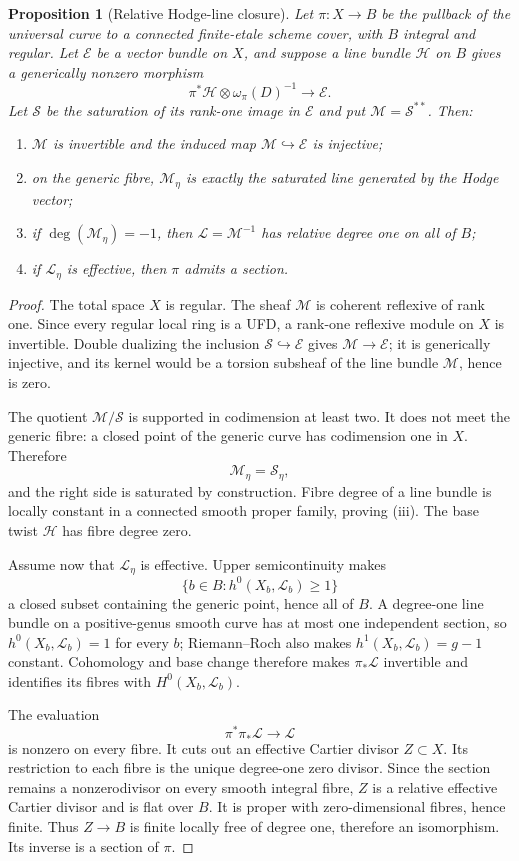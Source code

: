 \documentclass[11pt]{article}
\newtheorem{proposition}[theorem]{Proposition}
\theoremstyle{definition}
\newcommand{\Mcal}{\mathcal M}
\newcommand{\Ecal}{\mathcal E}
\newcommand{\Lcal}{\mathcal L}
\newcommand{\Hcal}{\mathcal H}
\newcommand{\Scal}{\mathcal S}
\begin{document}
\begin{proposition}[Relative Hodge-line closure]
\label{prop:relative-hodge-line}
Let $\pi:X\to B$ be the pullback of the universal curve to a connected
finite-etale scheme cover, with $B$ integral and regular.  Let $\Ecal$ be a
vector bundle on $X$, and suppose a line bundle $\Hcal$ on $B$ gives a
generically nonzero morphism
\[
 \pi^*\Hcal\otimes\omega_\pi(D)^{-1}\longrightarrow\Ecal.
\]
Let $\Scal$ be the saturation of its rank-one image in $\Ecal$ and put
$\Mcal=\Scal^{**}$.  Then:
\begin{enumerate}[label=\textup{(\roman*)}]
\item $\Mcal$ is invertible and the induced map
$\Mcal\hookrightarrow\Ecal$ is injective;
\item on the generic fibre, $\Mcal_\eta$ is exactly the saturated line
generated by the Hodge vector;
\item if $\deg(\Mcal_\eta)=-1$, then $\Lcal=\Mcal^{-1}$ has relative degree
one on all of $B$;
\item if $\Lcal_\eta$ is effective, then $\pi$ admits a section.
\end{enumerate}
\end{proposition}

\begin{proof}
The total space $X$ is regular.  The sheaf $\Mcal$ is coherent reflexive of
rank one.  Since every regular local ring is a UFD, a rank-one reflexive
module on $X$ is invertible.  Double dualizing the inclusion
$\Scal\hookrightarrow\Ecal$ gives $\Mcal\to\Ecal$; it is generically
injective, and its kernel would be a torsion subsheaf of the line bundle
$\Mcal$, hence is zero.

The quotient $\Mcal/\Scal$ is supported in codimension at least two.  It does
not meet the generic fibre: a closed point of the generic curve has
codimension one in $X$.  Therefore
\[
 \Mcal_\eta=\Scal_\eta,
\]
and the right side is saturated by construction.  Fibre degree of a line
bundle is locally constant in a connected smooth proper family, proving
(iii).  The base twist $\Hcal$ has fibre degree zero.

Assume now that $\Lcal_\eta$ is effective.  Upper semicontinuity makes
\[
 \{b\in B:h^0(X_b,\Lcal_b)\ge1\}
\]
a closed subset containing the generic point, hence all of $B$.  A degree-one
line bundle on a positive-genus smooth curve has at most one independent
section, so $h^0(X_b,\Lcal_b)=1$ for every $b$; Riemann--Roch also makes
$h^1(X_b,\Lcal_b)=g-1$ constant.  Cohomology and base change therefore makes
$\pi_*\Lcal$ invertible and identifies its fibres with
$H^0(X_b,\Lcal_b)$.

The evaluation
\[
 \pi^*\pi_*\Lcal\longrightarrow\Lcal
\]
is nonzero on every fibre.  It cuts out an effective Cartier divisor
$Z\subset X$.  Its restriction to each fibre is the unique degree-one zero
divisor.  Since the section remains a nonzerodivisor on every smooth integral
fibre, $Z$ is a relative effective Cartier divisor and is flat over $B$.
It is proper with zero-dimensional fibres, hence finite.  Thus $Z\to B$ is
finite locally free of degree one, therefore an isomorphism.  Its inverse is a
section of $\pi$.
\end{proof}
\end{document}
